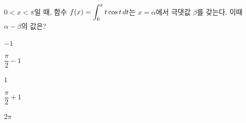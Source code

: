 \hspace*{2mm}\begin{minipage}[t]{\dimexpr\linewidth-2mm\relax}\vspace{0pt}
$0<x<\pi$일 때, 함수 $f(x)=\displaystyle\int_{0}^{x}t\cos t\mkern3mu dt$는 $x=\alpha$에서 극댓값 $\beta$를 갖는다. 이때 $\alpha-\beta$의 값은?
\begin{choices32}{\rule[-3ex]{0pt}{8ex}$-1$}{\rule[-3ex]{0pt}{8ex}$\dfrac{\pi}{2}-1$}{\rule[-3ex]{0pt}{8ex}$1$}{\rule[-3ex]{0pt}{8ex}$\dfrac{\pi}{2}+1$}{\rule[-3ex]{0pt}{8ex}$2\pi$}\end{choices32}\end{minipage}
